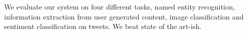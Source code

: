 We evaluate our system on four different tasks, named entity recognition, information extraction from user generated content, image classification and sentiment classification on tweets.
We beat state of the art-ish.

% 
% 
% 
% 
% 
